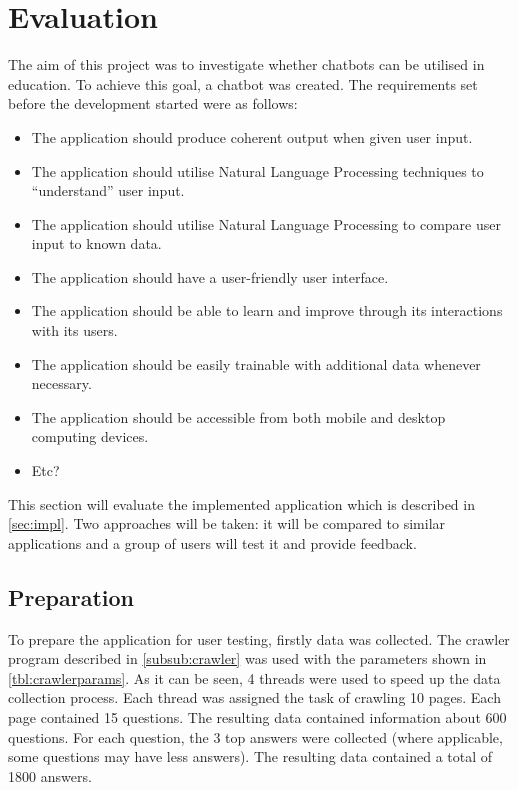 \documentclass[12pt,a4paper]{article}
\begin{document}
\section{Evaluation}
The aim of this project was to investigate whether chatbots can be utilised in education. To achieve this goal, a chatbot was created. The requirements set before the development started were as follows:
\begin{itemize}
    \item The application should produce coherent output when given user input.
    \item The application should utilise Natural Language Processing techniques to “understand” user input.
    \item The application should utilise Natural Language Processing to compare user input to known data.
    \item The application should have a user-friendly user interface.
    \item The application should be able to learn and improve through its interactions with its users.
    \item The application should be easily trainable with additional data whenever necessary.
    \item The application should be accessible from both mobile and desktop computing devices.
    \item Etc?
\end{itemize}

This section will evaluate the implemented application which is described in \cref{sec:impl}. Two approaches will be taken: it will be compared to similar applications and a group of users will test it and provide feedback.

\subsection{Preparation}\label{subsec:prep}
To prepare the application for user testing, firstly data was collected. The crawler program described in \cref{subsub:crawler} was used with the parameters shown in \cref{tbl:crawlerparams}. As it can be seen, 4 threads were used to speed up the data collection process. Each thread was assigned the task of crawling 10 pages. Each page contained 15 questions. The resulting data contained information about 600 questions. For each question, the 3 top answers were collected (where applicable, some questions may have less answers). The resulting data contained a total of 1800 answers.
\end{document}
